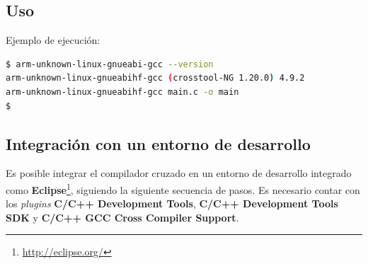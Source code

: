 \documentclass{article}
\begin{document}
\subsection{Uso}

Ejemplo de ejecución:

\begin{lstlisting}[language=bash]
$ arm-unknown-linux-gnueabi-gcc --version
arm-unknown-linux-gnueabihf-gcc (crosstool-NG 1.20.0) 4.9.2
arm-unknown-linux-gnueabihf-gcc main.c -o main
$
\end{lstlisting}

\subsection{Integración con un entorno de desarrollo}

Es posible integrar el compilador cruzado en un entorno de desarrollo integrado como \textbf{Eclipse}\footnote{\href{http://eclipse.org/}{http://eclipse.org/}}, siguiendo la siguiente secuencia de pasos. Es necesario contar con los \textit{plugins} \textbf{C/C++ Development Tools}, \textbf{C/C++ Development Tools SDK} y \textbf{C/C++ GCC Cross Compiler Support}.
\end{document}
